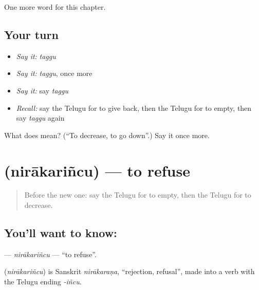\begin{grammarlens}[title={What you've built}]
One more word for this chapter.
\end{grammarlens}

\subsection*{Your turn}
\begin{itemize}
\raggedright
  \item \emph{Say it:} \emph{taggu}
  \item \emph{Say it:} \emph{taggu}, once more
  \item \emph{Say it:} say \emph{taggu}
  \item \emph{Recall:} say the Telugu for to give back, then the Telugu for to empty, then say \emph{taggu} again
\end{itemize}

\begin{tcolorbox}[breakable,colback=teal!4,colframe=teal!35!black,title={Before you move on}]
What does  mean? (\textquotedblleft{}To decrease, to go down\textquotedblright{}.) Say it once more.
\end{tcolorbox}
\section[\texorpdfstring{\te{నిరాకరించు} (nirākariñcu)}{నిరాకరించు (nirākariñcu)}]{ (nirākariñcu) — to refuse}

\label{lesson:TE-C246-nirakarincu}



\begin{quote}
Before the new one: say the Telugu for to empty, then the Telugu for to decrease.
\end{quote}

\subsection*{You'll want to know: }
\textbf{} — \emph{nirākariñcu} — \textquotedblleft{}to refuse\textquotedblright{}.

\begin{cousinweb}
\textbf{} (\emph{nirākariñcu}) is Sanskrit \emph{nirākaraṇa}, \textquotedblleft{}rejection, refusal\textquotedblright{}, made into a verb with the Telugu ending \emph{-iñcu}.
\end{cousinweb}

